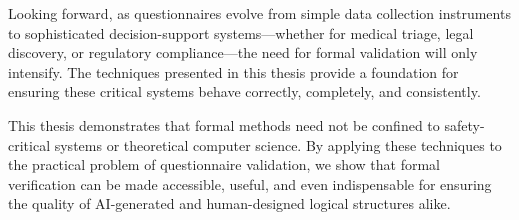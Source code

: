 Looking forward, as questionnaires evolve from simple data collection instruments to sophisticated decision-support systems—whether for medical triage, legal discovery, or regulatory compliance—the need for formal validation will only intensify. The techniques presented in this thesis provide a foundation for ensuring these critical systems behave correctly, completely, and consistently.

This thesis demonstrates that formal methods need not be confined to safety-critical systems or theoretical computer science. By applying these techniques to the practical problem of questionnaire validation, we show that formal verification can be made accessible, useful, and even indispensable for ensuring the quality of AI-generated and human-designed logical structures alike.
